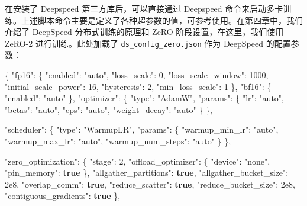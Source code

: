 \documentclass[
]{article}
\newenvironment{Shaded}{}{}
\newcommand{\DataTypeTok}[1]{\textcolor[rgb]{0.56,0.13,0.00}{#1}}
\newcommand{\DecValTok}[1]{\textcolor[rgb]{0.25,0.63,0.44}{#1}}
\newcommand{\FunctionTok}[1]{\textcolor[rgb]{0.02,0.16,0.49}{#1}}
\newcommand{\KeywordTok}[1]{\textcolor[rgb]{0.00,0.44,0.13}{\textbf{#1}}}
\newcommand{\StringTok}[1]{\textcolor[rgb]{0.25,0.44,0.63}{#1}}
\begin{document}
在安装了 Deepspeed 第三方库后，可以直接通过 Deepspeed
命令来启动多卡训练。上述脚本命令主要是定义了各种超参数的值，可参考使用。在第四章中，我们介绍了
DeepSpeed 分布式训练的原理和 ZeRO 阶段设置，在这里，我们使用 ZeRO-2
进行训练。此处加载了 \texttt{ds\_config\_zero.json} 作为 DeepSpeed
的配置参数：

\begin{Shaded}
\begin{Highlighting}[]
\FunctionTok{\{}
    \DataTypeTok{"fp16"}\FunctionTok{:} \FunctionTok{\{}
        \DataTypeTok{"enabled"}\FunctionTok{:} \StringTok{"auto"}\FunctionTok{,}
        \DataTypeTok{"loss\_scale"}\FunctionTok{:} \DecValTok{0}\FunctionTok{,}
        \DataTypeTok{"loss\_scale\_window"}\FunctionTok{:} \DecValTok{1000}\FunctionTok{,}
        \DataTypeTok{"initial\_scale\_power"}\FunctionTok{:} \DecValTok{16}\FunctionTok{,}
        \DataTypeTok{"hysteresis"}\FunctionTok{:} \DecValTok{2}\FunctionTok{,}
        \DataTypeTok{"min\_loss\_scale"}\FunctionTok{:} \DecValTok{1}
    \FunctionTok{\},}
    \DataTypeTok{"bf16"}\FunctionTok{:} \FunctionTok{\{}
        \DataTypeTok{"enabled"}\FunctionTok{:} \StringTok{"auto"}
    \FunctionTok{\},}
    \DataTypeTok{"optimizer"}\FunctionTok{:} \FunctionTok{\{}
        \DataTypeTok{"type"}\FunctionTok{:} \StringTok{"AdamW"}\FunctionTok{,}
        \DataTypeTok{"params"}\FunctionTok{:} \FunctionTok{\{}
            \DataTypeTok{"lr"}\FunctionTok{:} \StringTok{"auto"}\FunctionTok{,}
            \DataTypeTok{"betas"}\FunctionTok{:} \StringTok{"auto"}\FunctionTok{,}
            \DataTypeTok{"eps"}\FunctionTok{:} \StringTok{"auto"}\FunctionTok{,}
            \DataTypeTok{"weight\_decay"}\FunctionTok{:} \StringTok{"auto"}
        \FunctionTok{\}}
    \FunctionTok{\},}

    \DataTypeTok{"scheduler"}\FunctionTok{:} \FunctionTok{\{}
        \DataTypeTok{"type"}\FunctionTok{:} \StringTok{"WarmupLR"}\FunctionTok{,}
        \DataTypeTok{"params"}\FunctionTok{:} \FunctionTok{\{}
            \DataTypeTok{"warmup\_min\_lr"}\FunctionTok{:} \StringTok{"auto"}\FunctionTok{,}
            \DataTypeTok{"warmup\_max\_lr"}\FunctionTok{:} \StringTok{"auto"}\FunctionTok{,}
            \DataTypeTok{"warmup\_num\_steps"}\FunctionTok{:} \StringTok{"auto"}
        \FunctionTok{\}}
    \FunctionTok{\},}

    \DataTypeTok{"zero\_optimization"}\FunctionTok{:} \FunctionTok{\{}
        \DataTypeTok{"stage"}\FunctionTok{:} \DecValTok{2}\FunctionTok{,}
        \DataTypeTok{"offload\_optimizer"}\FunctionTok{:} \FunctionTok{\{}
            \DataTypeTok{"device"}\FunctionTok{:} \StringTok{"none"}\FunctionTok{,}
            \DataTypeTok{"pin\_memory"}\FunctionTok{:} \KeywordTok{true}
        \FunctionTok{\},}
        \DataTypeTok{"allgather\_partitions"}\FunctionTok{:} \KeywordTok{true}\FunctionTok{,}
        \DataTypeTok{"allgather\_bucket\_size"}\FunctionTok{:} \DecValTok{2e8}\FunctionTok{,}
        \DataTypeTok{"overlap\_comm"}\FunctionTok{:} \KeywordTok{true}\FunctionTok{,}
        \DataTypeTok{"reduce\_scatter"}\FunctionTok{:} \KeywordTok{true}\FunctionTok{,}
        \DataTypeTok{"reduce\_bucket\_size"}\FunctionTok{:} \DecValTok{2e8}\FunctionTok{,}
        \DataTypeTok{"contiguous\_gradients"}\FunctionTok{:} \KeywordTok{true}
    \FunctionTok{\},}


\end{Highlighting}
\end{Shaded}
\end{document}
